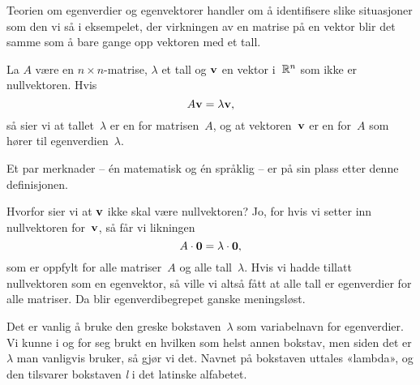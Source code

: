 Teorien om egenverdier og egenvektorer handler om å identifisere slike
situasjoner som den vi så i eksempelet, der virkningen av en matrise
på en vektor blir det samme som å bare gange opp vektoren med et tall.

\begin{defn}
La $A$ være en $n \times n$-matrise, $\lambda$ et tall og $\mathbf{v}$ en
vektor i~$\mathbb{R}^n$ som ikke er nullvektoren.  Hvis
\[
A \mathbf{v} = \lambda \mathbf{v},
\]
så sier vi at tallet~$\lambda$ er en  for
matrisen~$A$, og at vektoren~$\mathbf{v}$ er en 
for~$A$ som hører til egenverdien~$\lambda$.
\end{defn}

Et par merknader -- én matematisk og én språklig -- er på sin plass
etter denne definisjonen.

\begin{merk}
Hvorfor sier vi at $\mathbf{v}$ ikke skal være nullvektoren?  Jo, for hvis
vi setter inn nullvektoren for~$\mathbf{v}$, så får vi likningen
\[
A \cdot \mathbf{0} = \lambda \cdot \mathbf{0},
\]
som er oppfylt for alle matriser~$A$ og alle tall~$\lambda$.  Hvis vi
hadde tillatt nullvektoren som en egenvektor, så ville vi altså fått
at alle tall er egenverdier for alle matriser.  Da blir
egenverdibegrepet ganske meningsløst.
\end{merk}

\begin{merk}
Det er vanlig å bruke den greske bokstaven~$\lambda$ som variabelnavn
for egenverdier.  Vi kunne i og for seg brukt en hvilken som helst
annen bokstav, men siden det er $\lambda$ man vanligvis bruker, så
gjør vi det.  Navnet på bokstaven uttales «lambda», og den tilsvarer
bokstaven \emph{l} i det latinske alfabetet.
\end{merk}

